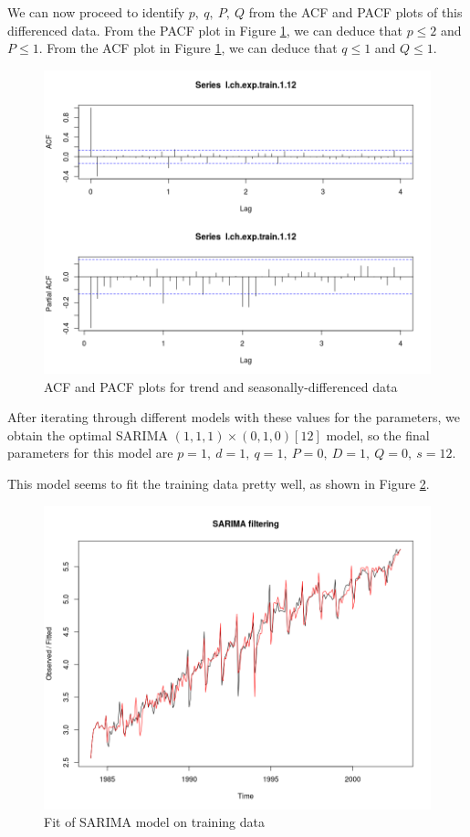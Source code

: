 \documentclass[]{article}
\begin{document}
We can now proceed to identify $p,\ q,\ P,\ Q$ from the ACF and PACF plots of this differenced data. From the PACF plot in Figure \ref{acf_pacf_sarima}, we can deduce that $p \leq 2$ and $P \leq 1$. From the ACF plot in Figure \ref{acf_pacf_sarima}, we can deduce that $q \leq 1$ and $Q \leq 1$.

\begin{figure}[!ht]
\centering
\includegraphics[width=.8\textwidth]{acf_pacf_sarima}
\caption{ACF and PACF plots for trend and seasonally-differenced data}
\label{acf_pacf_sarima}
\end{figure}

After iterating through different models with these values for the parameters, we obtain the optimal SARIMA $(1,1,1)\times(0,1,0)[12]$ model, so the final parameters for this model are $p=1,\ d=1,\ q=1,\ P=0,\ D=1,\ Q=0,\ s=12$.

This model seems to fit the training data pretty well, as shown in Figure \ref{fit_sarima}.

\begin{figure}[!ht]
\centering
\includegraphics[width=.8\textwidth]{fit_sarima}
\caption{Fit of SARIMA model on training data}
\label{fit_sarima}
\end{figure}
\end{document}
